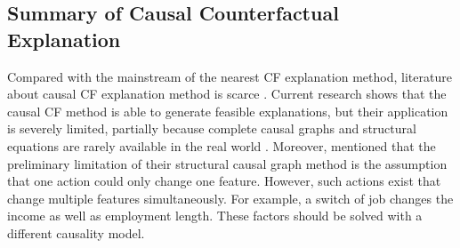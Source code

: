 \subsection{Summary of Causal Counterfactual Explanation}
Compared with the mainstream of the nearest CF explanation method, literature about causal CF explanation method is scarce \cite{algorithmicrecourse}. Current research shows that the causal CF method is able to generate feasible explanations, but their application is severely limited, partially because complete causal graphs and structural equations are rarely available in the real world \cite{CFReview}. Moreover, \citeauthor{algorithmicrecourse} \cite{algorithmicrecourse} mentioned that the preliminary limitation of their structural causal graph method is the assumption that one action could only change one feature. However, such actions exist that change multiple features simultaneously. For example, a switch of job changes the income as well as employment length. These factors should be solved with a different causality model.    